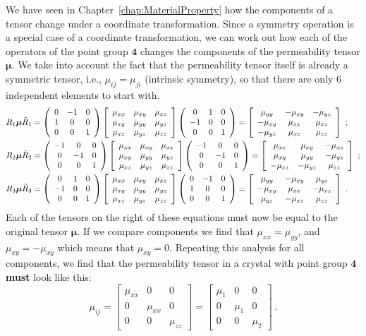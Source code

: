 We have seen in Chapter~\ref{chap:MaterialProperty} how the components of a tensor change under a coordinate transformation. Since a symmetry operation is a special case of a coordinate transformation, we can work out how each of the operators of the point group $\textbf{4}$ changes the components of the permeability tensor $\bm{\mu}$.  We take into account the fact that the permeability tensor itself is already a symmetric tensor, i.e., $\mu_{ij}=\mu_{ji}$ (intrinsic symmetry), so that there are only $6$ independent elements to start with.
{\small\begin{align*}
	R_1\bm{\mu}\tilde{R}_1 &= \left(\begin{array}{ccc} 0 & -1 & 0 \\ 1 & 0 & 0 \\ 0 & 0 & 1\end{array}\right)
	\left[\begin{array}{ccc} \mu_{xx} & \mu_{xy} & \mu_{xz} \\ \mu_{xy} & \mu_{yy} & \mu_{yz} \\ \mu_{xz} & \mu_{yz} & \mu_{zz}\end{array}\right]\left(\begin{array}{ccc} 0 & 1 & 0 \\ -1 & 0 & 0 \\ 0 & 0 & 1\end{array}\right) = 
	\left[\begin{array}{ccc} 
	 \mu_{yy} & -\mu_{xy} & -\mu_{yz} \\ 
	-\mu_{xy} &  \mu_{xx} & \mu_{xz} \\ 
	-\mu_{yz} &  \mu_{xz} & \mu_{zz}\end{array}\right]\ ;\\
	R_2\bm{\mu}\tilde{R}_2 &= \left(\begin{array}{ccc} -1 & 0 & 0 \\ 0 & -1 & 0 \\ 0 & 0 & 1\end{array}\right)
	\left[\begin{array}{ccc} \mu_{xx} & \mu_{xy} & \mu_{xz} \\ \mu_{xy} & \mu_{yy} & \mu_{yz} \\ \mu_{xz} & \mu_{yz} & \mu_{zz}\end{array}\right]\left(\begin{array}{ccc} -1 & 0 & 0 \\ 0 & -1 & 0 \\ 0 & 0 & 1\end{array}\right) = 
	\left[\begin{array}{ccc} 
	 \mu_{xx} & \mu_{xy} & -\mu_{xz} \\ 
	\mu_{xy} &  \mu_{yy} & -\mu_{yz} \\ 
	-\mu_{xz} &  -\mu_{yz} & \mu_{zz}\end{array}\right]\ ;\\
	R_3\bm{\mu}\tilde{R}_3 &= \left(\begin{array}{ccc} 0 & 1 & 0 \\ -1 & 0 & 0 \\ 0 & 0 & 1\end{array}\right)
	\left[\begin{array}{ccc} \mu_{xx} & \mu_{xy} & \mu_{xz} \\ \mu_{xy} & \mu_{yy} & \mu_{yz} \\ \mu_{xz} & \mu_{yz} & \mu_{zz}\end{array}\right]\left(\begin{array}{ccc} 0 & -1 & 0 \\ 1 & 0 & 0 \\ 0 & 0 & 1\end{array}\right) = 
	\left[\begin{array}{ccc} 
	 \mu_{yy} & -\mu_{xy} & \mu_{yz} \\ 
	-\mu_{xy} &  \mu_{xx} & -\mu_{xz} \\ 
	\mu_{yz} &  -\mu_{xz} & \mu_{zz}\end{array}\right]\ .
\end{align*}}
Each of the tensors on the right of these equations must now be equal to the original tensor $\bm{\mu}$.  If we
compare components we find that $\mu_{xx}=\mu_{yy}$, and $\mu_{xy}=-\mu_{xy}$ which means that 
$\mu_{xy}=0$.  Repeating this analysis for all components, we find that the permeability tensor in a crystal with point
group $\textbf{4}$ \textbf{must} look like this:
\begin{equation}
	\mu_{ij} =  \left[\begin{array}{ccc} 
	\mu_{xx} & 0 & 0 \\ 
	0 &  \mu_{xx} & 0 \\ 
	0 & 0 & \mu_{zz}\end{array}\right] = \left[\begin{array}{ccc} 
	\mu_{1} & 0 & 0 \\ 
	0 &  \mu_{1} & 0 \\ 
	0 & 0 & \mu_{2}\end{array}\right]\ .
\end{equation}
